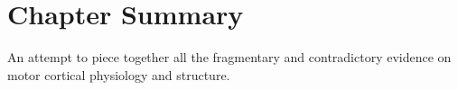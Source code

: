 				
\section{Chapter Summary}

An attempt to piece together all the fragmentary and contradictory evidence on motor cortical physiology and structure.

\pagebreak


